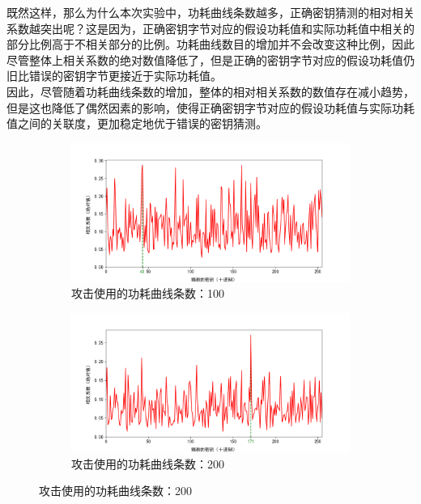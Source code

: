 \begin{enumerate}
    既然这样，那么为什么本次实验中，功耗曲线条数越多，正确密钥猜测的相对相关系数越突出呢？这是因为，正确密钥字节对应的假设功耗值和实际功耗值中相关的部分比例高于不相关部分的比例。功耗曲线数目的增加并不会改变这种比例，因此尽管整体上相关系数的绝对数值降低了，但是正确的密钥字节对应的假设功耗值仍旧比错误的密钥字节更接近于实际功耗值。\\
    因此，尽管随着功耗曲线条数的增加，整体的相对相关系数的数值存在减小趋势，但是这也降低了偶然因素的影响，使得正确密钥字节对应的假设功耗值与实际功耗值之间的关联度，更加稳定地优于错误的密钥猜测。


\end{enumerate}

\begin{figure}[htbp]
    \centering

    \begin{subfigure}{1.0\textwidth}
        \includegraphics[height=.21\textheight, width=1.0\textwidth]{../images/keyguess_100.png}
        \caption{攻击使用的功耗曲线条数：100}
    \end{subfigure}
    \begin{subfigure}{1.0\textwidth}
        \includegraphics[height=.21\textheight, width=1.0\textwidth]{../images/keyguess_200.png}
        \caption{攻击使用的功耗曲线条数：200}

\end{subfigure}
\end{figure}
